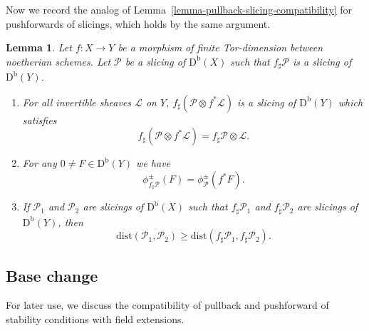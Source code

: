\documentclass[11pt, reqno]{amsart}
\numberwithin{equation}{section}
\theoremstyle{plain}
\newtheorem{lemma}[theorem]{Lemma}
\theoremstyle{remark}
\theoremstyle{definition}
\theoremstyle{italicsname}
\newcommand{\Db}{\mathrm{D^b}}
\newcommand{\cL}{\mathcal{L}}
\newcommand{\cP}{\mathscr{P}}
\begin{document}
Now we record the analog of Lemma~\ref{lemma-pullback-slicing-compatibility} for pushforwards of slicings, which holds by the same argument. 

\begin{lemma}
    \label{lemma-pushforward-slicing-compatibility}
    Let $f \colon X \to Y$ be a morphism of finite Tor-dimension between noetherian schemes. 
    Let $\cP$ be a slicing of $\Db(X)$ such that $f_\sharp \cP$ is a slicing of $\Db(Y)$. 
    \begin{enumerate}[{\rm (1)}]
    \item \label{pushforward-slicing-compatibility-tensorL}
    For all invertible sheaves $\cL$ on $Y$, $f_{\sharp}(\cP \otimes f^*\cL)$ is a slicing of $\Db(Y)$ which satisfies
    \[
    f_\sharp\left(\cP\otimes f^*\cL\right)=f_\sharp\cP\otimes \cL.
    \]

    \item \label{pushforward-slicing-compatibility-phipm}
    For any $0 \neq F \in \Db(Y)$ we have 
    \begin{equation*} 
    \phi^{\pm}_{f_{\sharp}\cP}(F) = \phi^{\pm}_{\cP}(f^*F).
    \end{equation*} 

    \item \label{pushforward-slicing-compatibility-dist}
If $\cP_1$ and $\cP_2$ are slicings of $\Db(X)$ such that $f_\sharp\cP_1$ and $f_\sharp\cP_2$ are slicings of $\Db(Y)$, then
\[
\mathrm{dist}(\cP_1,\cP_2)\geq\mathrm{dist}(f_\sharp\cP_1,f_\sharp\cP_2).
\]
    \end{enumerate}
\end{lemma}

\subsection{Base change} 
\label{section-base-change-pull-push-stability}
For later use, we discuss the compatibility of pullback and pushforward of stability conditions with field extensions.
\end{document}
